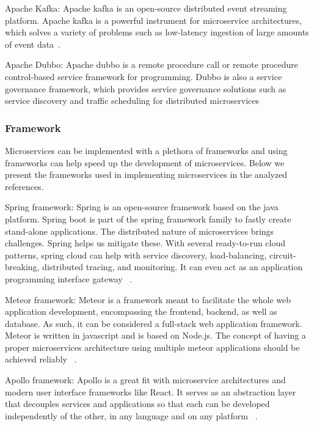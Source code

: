 \par Apache Kafka: Apache kafka is an open-source distributed event streaming platform. Apache kafka is a powerful instrument for microservice architectures, which solves a variety of problems such as low-latency ingestion of large amounts of event data~\cite{wang2020, ebay}.

\par Apache Dubbo: Apache dubbo is a remote procedure call or remote procedure control-based service framework for programming. Dubbo is also a service governance framework, which provides service governance solutions such as service discovery and traffic scheduling for distributed microservices~\cite{Zhang2019}


\subsubsection{Framework}

Microservices can be implemented with a plethora of frameworks and using frameworks can help speed up the development of microservices. Below we present the frameworks used in implementing microservices in the analyzed references.

\par Spring framework: Spring is an open-source framework based on the java platform. Spring boot is part of the spring framework family to fastly create stand-alone applications. The distributed nature of microservices brings challenges. Spring helps us mitigate these. With several ready-to-run cloud patterns, spring cloud can help with service discovery, load-balancing, circuit-breaking, distributed tracing, and monitoring. It can even act as an application programming interface gateway ~\cite{KalskeM2017, selmadji2020, Santos2020}.

\par Meteor framework: Meteor is a framework meant to facilitate the whole web application development, encompassing the frontend, backend, as well as database. As such, it can be considered a full-stack web application framework. Meteor is written in javascript and is based on Node.js. The concept of having a proper microservices architecture using multiple meteor applications should be achieved reliably ~\cite{Tuuli2020}.


\par Apollo framework: Apollo is a great fit with microservice architectures and modern user interface frameworks like React. It serves as an abstraction layer that decouples services and applications so that each can be developed independently of the other, in any language and on any platform ~\cite{Kevin2015}.

